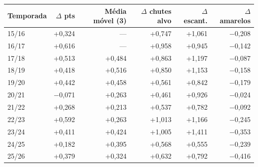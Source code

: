 \begin{tabular}{lrrrrr}
  \toprule
  Temporada & $\Delta$ pts & Média móvel (3) & $\Delta$ chutes alvo & $\Delta$ escant. & $\Delta$ amarelos \\
  \midrule
  15/16 & +0,324 & --- & +0,747 & +1,061 & $-$0,208 \\
  16/17 & +0,616 & --- & +0,958 & +0,945 & $-$0,142 \\
  17/18 & +0,513 & +0,484 & +0,863 & +1,197 & $-$0,087 \\
  18/19 & +0,418 & +0,516 & +0,850 & +1,153 & $-$0,158 \\
  19/20 & +0,442 & +0,458 & +0,561 & +0,842 & $-$0,179 \\
  20/21 & $-$0,071 & +0,263 & +0,461 & +0,926 & $-$0,024 \\
  21/22 & +0,268 & +0,213 & +0,537 & +0,782 & $-$0,092 \\
  22/23 & +0,592 & +0,263 & +1,013 & +1,166 & $-$0,245 \\
  23/24 & +0,411 & +0,424 & +1,005 & +1,411 & $-$0,353 \\
  24/25 & +0,182 & +0,395 & +0,568 & +0,555 & $-$0,239 \\
  25/26 & +0,379 & +0,324 & +0,632 & +0,792 & $-$0,416 \\
  \bottomrule
\end{tabular}
